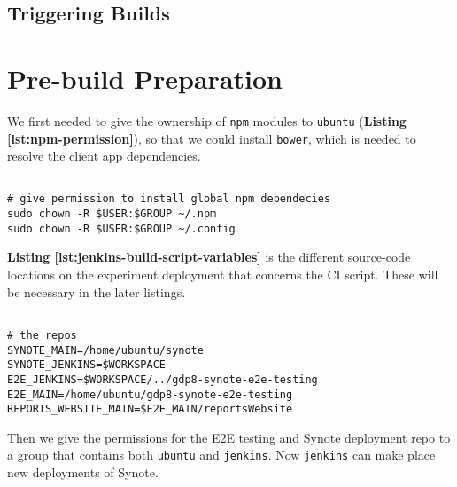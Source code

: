 \subsection{Triggering Builds}
\label{subsec:triggering-builds}

\section{Pre-build Preparation}
\label{sec:pre-build-preparation}

We first needed to give the ownership of \texttt{npm} modules to \texttt{ubuntu} (\textbf{Listing \ref{lst:npm-permission}}), so that we could install \texttt{bower}, which is needed to resolve the client app dependencies.

\begin{listing}[H]
\begin{verbatim}

# give permission to install global npm dependecies
sudo chown -R $USER:$GROUP ~/.npm
sudo chown -R $USER:$GROUP ~/.config

\end{verbatim}
\label{lst:npm-permission}
\end{listing}

\textbf{Listing \ref{lst:jenkins-build-script-variables}} is the different source-code locations on the experiment deployment that concerns the CI script. These will be necessary in the later listings.

\begin{listing}[H]
\begin{verbatim}

# the repos
SYNOTE_MAIN=/home/ubuntu/synote
SYNOTE_JENKINS=$WORKSPACE
E2E_JENKINS=$WORKSPACE/../gdp8-synote-e2e-testing
E2E_MAIN=/home/ubuntu/gdp8-synote-e2e-testing
REPORTS_WEBSITE_MAIN=$E2E_MAIN/reportsWebsite

\end{verbatim}
\label{lst:jenkins-build-script-variables}
\end{listing}

Then we give the permissions for the E2E testing and Synote deployment repo to a group that contains both \texttt{ubuntu} and \texttt{jenkins}. Now \texttt{jenkins} can make place new deployments of Synote.

